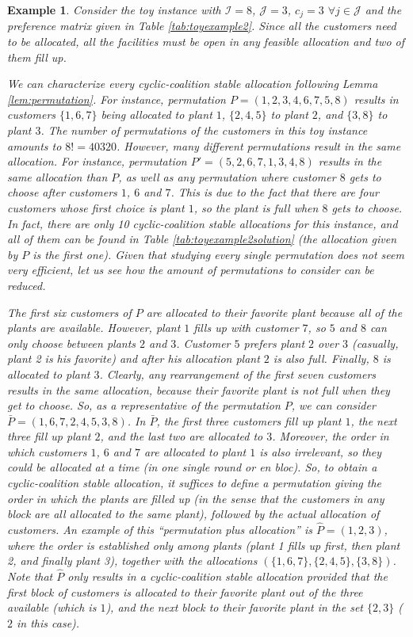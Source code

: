 \documentclass[preprint,11pt,authoryear]{elsarticle}
\def\J{\mathcal{J}}
\def\I{\mathcal{I}}
\newtheorem{example}{Example}
\begin{document}
\begin{example} \label{example2} 
    Consider the toy instance with $\I=8$, $\J=3$, $c_j=3$ $\forall j\in \J$ and the preference matrix given in Table \ref{tab:toyexample2}. Since all the customers need to be allocated, all the facilities must be open in any feasible allocation and two of them fill up. 

    We can characterize every cyclic-coalition stable allocation following Lemma \ref{lem:permutation}. For instance, permutation $P=(1,2,3,4,6,7,5,8)$ results in customers $\{1,6,7\}$ being allocated to plant $1$, $\{2,4,5\}$ to plant $2$, and $\{3,8\}$ to plant $3$. The number of permutations of the customers in this toy instance amounts to $8!=40320$. However, many different permutations result in the same allocation. For instance, permutation $P'=(5, 2, 6, 7, 1, 3, 4, 8)$ results in the same allocation than $P$, as well as any permutation where customer $8$ gets to choose after customers $1$, $6$ and $7$. This is due to the fact that there are four customers whose first choice is plant $1$, so the plant is full when $8$ gets to choose. In fact, there are only 10 cyclic-coalition stable allocations for this instance, and all of them can be found in Table \ref{tab:toyexample2solution} (the allocation given by $P$ is the first one). Given that studying every single permutation does not seem very efficient, let us see how the amount of permutations to consider can be reduced. 

    The first six customers of $P$ are allocated to their favorite plant because all of the plants are available. However, plant $1$ fills up with customer $7$, so $5$ and $8$ can only choose between plants $2$ and $3$. Customer $5$ prefers plant $2$ over $3$ (casually, plant 2 is his favorite) and after his allocation plant $2$ is also full. Finally, $8$ is allocated to plant $3$. Clearly, any rearrangement of the first seven customers results in the same allocation, because their favorite plant is not full when they get to choose. So, as a representative of the permutation $P$, we can consider $\bar{P}=(1,6,7,2,4,5,3,8)$. In $\bar{P}$, the first three customers fill up plant $1$, the next three fill up plant $2$, and the last two are allocated to $3$. Moreover, the order in which customers $1$, $6$ and $7$ are allocated to plant $1$ is also irrelevant, so they could be allocated at a time (in one single \emph{round} or \emph{en bloc}). So, to obtain a cyclic-coalition stable allocation, it suffices to define a permutation giving the order in which the \emph{plants} are filled up (in the sense that the customers in any block are all allocated to the same plant), followed by the actual allocation of customers. An example of this ``permutation plus allocation'' is $\hat{P}=(1,2,3)$, where the order is established only among plants (plant 1 fills up first, then plant 2, and finally plant 3), together with the allocations $(\{1,6,7\},\{2,4,5\},\{3,8\})$. Note that $\hat{P}$ only results in a cyclic-coalition stable allocation provided that the first block of customers is allocated to their favorite plant out of the three available (which is $1$), and the next block to their favorite plant in the set $\{2,3\}$ ($2$ in this case).  
        

\end{example}
\end{document}
